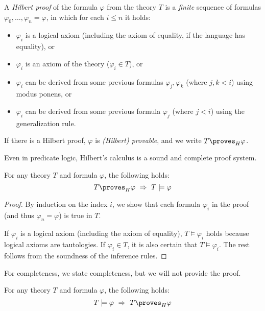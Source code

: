 \begin{definition}
    A \emph{Hilbert proof} of the formula $\varphi$ from the theory $T$ is a \emph{finite} sequence of formulas $\varphi_0, \dots, \varphi_n=\varphi$, in which for each $i\le n$ it holds:
    \begin{itemize}
    \item $\varphi_i$ is a logical axiom (including the axiom of equality, if the language has equality), or
    \item $\varphi_i$ is an axiom of the theory ($\varphi_i \in T$), or
    \item $\varphi_i$ can be derived from some previous formulas $\varphi_j,\varphi_k$ (where $j,k<i$) using modus ponens, or
    \item $\varphi_i$ can be derived from some previous formula $\varphi_j$ (where $j<i$) using the generalization rule.
    \end{itemize}
    If there is a Hilbert proof, $\varphi$ is \emph{(Hilbert) provable}, and we write $T\proves_H\varphi$.           
\end{definition}

Even in predicate logic, Hilbert's calculus is a sound and complete proof system.

\begin{theorem}
For any theory $T$ and formula $\varphi$, the following holds: 
$$
T\proves_H \varphi\ \Rightarrow\ T\models\varphi
$$ 
\end{theorem}
\begin{proof}
By induction on the index $i$, we show that each formula $\varphi_i$ in the proof (and thus $\varphi_n=\varphi$) is true in $T$.

If $\varphi_i$ is a logical axiom (including the axiom of equality), $T \models \varphi_i$ holds because logical axioms are tautologies. If $\varphi_i\in T$, it is also certain that $T \models \varphi_i$. The rest follows from the soundness of the inference rules.
\end{proof}

For completeness, we state completeness, but we will not provide the proof.

\begin{theorem}
For any theory $T$ and formula $\varphi$, the following holds: 
$$
T\models\varphi\ \Rightarrow\ T\proves_H\varphi
$$
\end{theorem}
